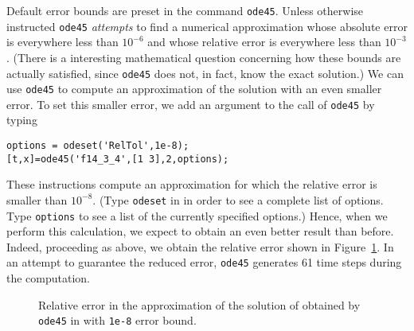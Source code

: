 Default error bounds are preset in the command {\tt ode45}.  Unless otherwise
instructed {\tt ode45} {\em attempts\/} to find a numerical approximation 
whose absolute error is everywhere less than $10^{-6}$ and whose relative 
error is everywhere less than $10^{-3}$.  (There is a interesting mathematical
question concerning how these bounds are actually satisfied, since 
{\tt ode45} does not, in fact, know the exact solution.)  We can use 
{\tt ode45} to compute an approximation of the solution with an even smaller 
error.  To set this smaller error, we add an argument to the call of 
{\tt ode45} by typing 
\begin{verbatim}
options = odeset('RelTol',1e-8);
[t,x]=ode45('f14_3_4',[1 3],2,options);
\end{verbatim}
These instructions compute an approximation for which the relative error 
 is smaller than $10^{-8}$.  
(Type {\tt odeset} in \Matlab in order to see a 
complete list of options. Type {\tt options} to see a list of the currently
specified options.)  Hence, when we perform 
this calculation, we expect to obtain an even better result than before.  
Indeed, proceeding as above, we obtain the relative error shown 
in Figure~\ref{fig:ode45err2}.  In an attempt to guarantee the reduced error, 
{\tt ode45} generates 61 time steps during the computation.  

\begin{figure}[htb]
   \centerline{%
   }
   \caption{Relative error in the approximation of the solution of
   \protect{} obtained by {\tt ode45} in \protect\Matlab with 
	{\tt 1e-8} error bound.}
   \label{fig:ode45err2}
\end{figure}

\EXER

\CEXER

